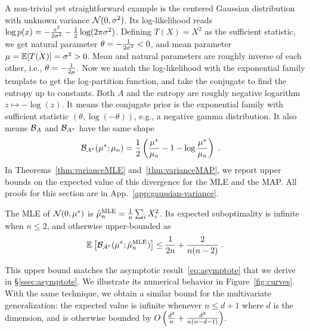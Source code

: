 \documentclass[twoside]{article}
\newcommand*{\expect}[2][]{\ensuremath{\mathbb{E}_{#1} \left[ #2 \right] }} %
\newcommand{\logpart}{A}
\newcommand{\conj}{{\logpart^*}}
\newcommand{\bregman}{\cB_\logpart}
\newcommand{\bregmanconj}{\cB_{\logpart^*}}
\newcommand{\nat}{\theta}
\newcommand{\m}{\mu}
\begin{document}
A non-trivial yet straightforward example is the centered Gaussian distribution with unknown variance ${\mathcal N}(0,\sigma^2)$.
Its log-likelihood reads $\log p(x) = -\frac{x^2}{2 \sigma^2} - \frac{1}{2}\log(2\pi \sigma^2)$.
Defining $T(X)=X^2$ as the sufficient statistic, we get natural parameter $\nat = -\inv{2 \sigma^2} <0$, and mean parameter $\m=\E[T(X)] = \sigma^2 >0$.
Mean and natural parameters are roughly inverse of each other, i.e., $\nat = -\inv{2 \m}$.
Now we match the log-likelihood with the exponential family template to get the log-partition function, and take the conjugate to find the entropy
\aligns{
	\logpart (\nat) = - \half \log(-\nat) \quad\text{and}\quad
	\conj(\m) = - \half \log(\m)  \; ,
}
up to constants.
Both $A$ and  the entropy are roughly negative logarithm $z\mapsto - \log(z)$.
It means the conjugate prior is the exponential family with sufficient statistic $(\nat, \log(-\nat) )$, e.g., a negative gamma distribution.
It also means $\bregman$ and $\bregmanconj$ have the same shape
\begin{align}
	\bregmanconj( \m^*; \m_n)
	&= \half \left ( \frac{\m^*}{ \m_n} - 1 - \log  \frac{\m^*}{ \m_n} \right) \; .
\end{align}
In Theorems~\ref{thm:varianceMLE} and~\ref{thm:varianceMAP}, we report upper bounds on the expected value of this divergence for the MLE and the MAP.
All proofs for this section are in App.~\ref{app:gaussian-variance}.
\begin{theorem}
\label{thm:varianceMLE}
	The MLE of $\cN(0,\m^*)$ is $\hat \m_n^\text{MLE} = \inv{n} \sum_i X_i^2 $.
	Its expected suboptimality is infinite when $n\leq 2$, and otherwise upper-bounded as
	\begin{align}
		 \expect{\bregmanconj( \m^*; \hat \m_n^\text{MLE}) }
			\leq \inv{2n} +\frac{2}{n(n-2)} \; .
			\label{eq:MLE_rate}
	\end{align}
\end{theorem}
This upper bound matches the asymptotic result~\eqref{eq:asymptote} that we derive in \S\ref{ssec:asymptote}.
We illustrate its numerical behavior in Figure~\ref{fig:curves}.
With the same technique, we obtain a similar bound for the multivariate generalization: the expected value is infinite whenever $n \leq d+1$ where $d$ is the dimension, and is otherwise bounded by $O\left(\frac{d^2}{n} + \frac{d^3}{n(n-d-1)}\right)$.
\end{document}
